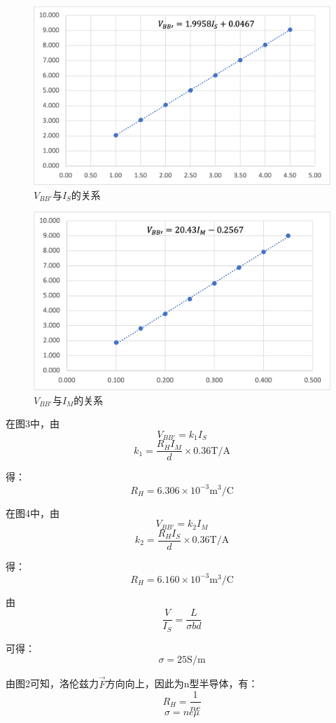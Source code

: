 \documentclass[UTF8]{ctexart}
\begin{document}
\begin{figure}[h]
  \centering
  \includegraphics[scale=0.7]{p2.png}
  \caption{$V_{BB'}$与$I_S$的关系}
\end{figure}
\begin{figure}[h]
  \centering
  \includegraphics[scale=0.7]{p3.png}
  \caption{$V_{BB'}$与$I_M$的关系}
\end{figure}
在图3中，由
\[V_{BB'} = k_1I_S\]
\[k_1 = \frac{R_HI_M}{d}\times 0.36\mathrm{T/A}\]

得：
\[R_H = 6.306\times 10^{-3}\mathrm{m^3/C}\]

在图4中，由
\[V_{BB'} = k_2I_M\]
\[k_2 = \frac{R_HI_S}{d}\times 0.36\mathrm{T/A}\]

得：
\[R_H = 6.160\times 10^{-3}\mathrm{m^3/C}\]

由
\[\frac{V}{I_S} = \frac{L}{\sigma bd}\]

可得：
\[\sigma = 25\mathrm{S/m}\]

由图2可知，洛伦兹力$\overrightarrow{F}$方向向上，因此为n型半导体，有：
\[R_H = \frac{1}{ne}\]
\[\sigma = ne\mu\]
\end{document}
